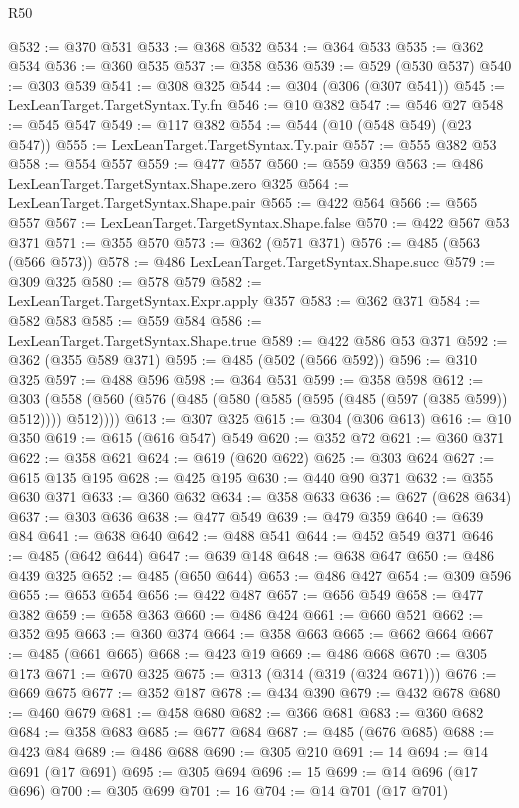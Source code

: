 \begin{lexlean}{R50}
\begin{coremodule}
@532 := @370 @531
@533 := @368 @532
@534 := @364 @533
@535 := @362 @534
@536 := @360 @535
@537 := @358 @536
@539 := @529 (@530 @537)
@540 := @303 @539
@541 := @308 @325
@544 := @304 (@306 (@307 @541))
@545 := LexLeanTarget.TargetSyntax.Ty.fn
@546 := @10 @382
@547 := @546 @27
@548 := @545 @547
@549 := @117 @382
@554 := @544 (@10 (@548 @549) (@23 @547))
@555 := LexLeanTarget.TargetSyntax.Ty.pair
@557 := @555 @382 @53
@558 := @554 @557
@559 := @477 @557
@560 := @559 @359
@563 := @486 LexLeanTarget.TargetSyntax.Shape.zero @325
@564 := LexLeanTarget.TargetSyntax.Shape.pair
@565 := @422 @564
@566 := @565 @557
@567 := LexLeanTarget.TargetSyntax.Shape.false
@570 := @422 @567 @53 @371
@571 := @355 @570
@573 := @362 (@571 @371)
@576 := @485 (@563 (@566 @573))
@578 := @486 LexLeanTarget.TargetSyntax.Shape.succ
@579 := @309 @325
@580 := @578 @579
@582 := LexLeanTarget.TargetSyntax.Expr.apply @357
@583 := @362 @371
@584 := @582 @583
@585 := @559 @584
@586 := LexLeanTarget.TargetSyntax.Shape.true
@589 := @422 @586 @53 @371
@592 := @362 (@355 @589 @371)
@595 := @485 (@502 (@566 @592))
@596 := @310 @325
@597 := @488 @596
@598 := @364 @531
@599 := @358 @598
@612 := @303 (@558 (@560 (@576 (@485 (@580 (@585 (@595 (@485 (@597 (@385 @599)) @512)))) @512))))
@613 := @307 @325
@615 := @304 (@306 @613)
@616 := @10 @350
@619 := @615 (@616 @547) @549
@620 := @352 @72
@621 := @360 @371
@622 := @358 @621
@624 := @619 (@620 @622)
@625 := @303 @624
@627 := @615 @135 @195
@628 := @425 @195
@630 := @440 @90 @371
@632 := @355 @630 @371
@633 := @360 @632
@634 := @358 @633
@636 := @627 (@628 @634)
@637 := @303 @636
@638 := @477 @549
@639 := @479 @359
@640 := @639 @84
@641 := @638 @640
@642 := @488 @541
@644 := @452 @549 @371
@646 := @485 (@642 @644)
@647 := @639 @148
@648 := @638 @647
@650 := @486 @439 @325
@652 := @485 (@650 @644)
@653 := @486 @427
@654 := @309 @596
@655 := @653 @654
@656 := @422 @487
@657 := @656 @549
@658 := @477 @382
@659 := @658 @363
@660 := @486 @424
@661 := @660 @521
@662 := @352 @95
@663 := @360 @374
@664 := @358 @663
@665 := @662 @664
@667 := @485 (@661 @665)
@668 := @423 @19
@669 := @486 @668
@670 := @305 @173
@671 := @670 @325
@675 := @313 (@314 (@319 (@324 @671)))
@676 := @669 @675
@677 := @352 @187
@678 := @434 @390
@679 := @432 @678
@680 := @460 @679
@681 := @458 @680
@682 := @366 @681
@683 := @360 @682
@684 := @358 @683
@685 := @677 @684
@687 := @485 (@676 @685)
@688 := @423 @84
@689 := @486 @688
@690 := @305 @210
@691 := 14
@694 := @14 @691 (@17 @691)
@695 := @305 @694
@696 := 15
@699 := @14 @696 (@17 @696)
@700 := @305 @699
@701 := 16
@704 := @14 @701 (@17 @701)

\end{coremodule}
\end{lexlean}
